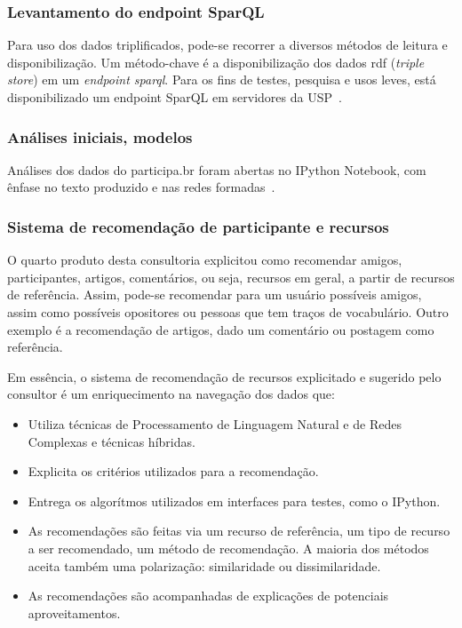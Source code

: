 \documentclass[12pt]{article}
\begin{document}
\subsubsection{Levantamento do endpoint SparQL}\label{sec:sfoo}
Para uso dos dados triplificados, pode-se recorrer a diversos métodos de leitura e disponibilização. Um método-chave é a disponibilização dos dados rdf (\emph{triple store}) em um \emph{endpoint sparql}. Para os fins de testes, pesquisa e usos leves, está disponibilizado um endpoint SparQL em servidores da USP~\cite{endpoint}.
\subsubsection{Análises iniciais, modelos}
Análises dos dados do participa.br foram abertas no IPython Notebook, com ênfase no texto produzido e nas redes formadas~\cite{repoProd3}.
\subsubsection{Sistema de recomendação de participante e recursos}
O quarto produto desta consultoria explicitou como recomendar amigos, participantes, artigos, comentários, ou seja, recursos em geral, a partir de recursos de referência. Assim, pode-se recomendar para um usuário possíveis amigos, assim como possíveis opositores ou pessoas que tem traços de vocabulário. Outro exemplo é a recomendação de artigos, dado um comentário ou postagem como referência.

Em essência, o sistema de recomendação de recursos explicitado e sugerido pelo consultor é um enriquecimento na navegação dos dados que:
\begin{itemize}
    \item Utiliza técnicas de Processamento de Linguagem Natural e de Redes Complexas e técnicas híbridas.
    \item Explicita os critérios utilizados para a recomendação.
    \item Entrega os algorítmos utilizados em interfaces para testes, como o IPython.
    \item As recomendações são feitas via um recurso de referência, um tipo de recurso a ser recomendado, um método de recomendação. A maioria dos métodos aceita também uma polarização: similaridade ou dissimilaridade.
    \item As recomendações são acompanhadas de explicações de potenciais aproveitamentos.
\end{itemize}
\end{document}
